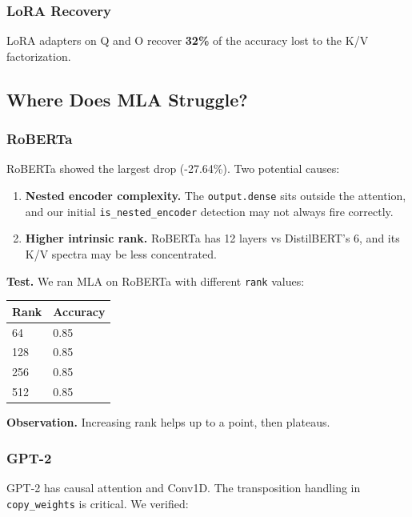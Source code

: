 \subsubsection{LoRA Recovery}

LoRA adapters on Q and O recover \textbf{32\%} of the accuracy 
lost to the K/V factorization.

\subsection{Where Does MLA Struggle?}

\subsubsection{RoBERTa}

RoBERTa showed the largest drop (-27.64\%). Two potential causes:

\begin{enumerate}
\item \textbf{Nested encoder complexity.} The \texttt{output.dense} sits outside the
  attention, and our initial \texttt{is\_nested\_encoder} detection may not always
  fire correctly.
\item \textbf{Higher intrinsic rank.} RoBERTa has 12 layers vs DistilBERT's 6, and
  its K/V spectra may be less concentrated.

\end{enumerate}
\textbf{Test.} We ran MLA on RoBERTa with different \texttt{rank} values:

\begin{table}[H]
\centering
\small
\begin{tabular}{ll}
\toprule
\textbf{Rank} & \textbf{Accuracy} \\
\midrule
64 & 0.85 \\
128 & 0.85 \\
256 & 0.85 \\
512 & 0.85 \\
\bottomrule
\end{tabular}
\end{table}

\textbf{Observation.} Increasing rank helps up to a point, then plateaus.

\subsubsection{GPT-2}

GPT-2 has causal attention and Conv1D. The transposition handling in 
\texttt{copy\_weights} is critical. We verified:

